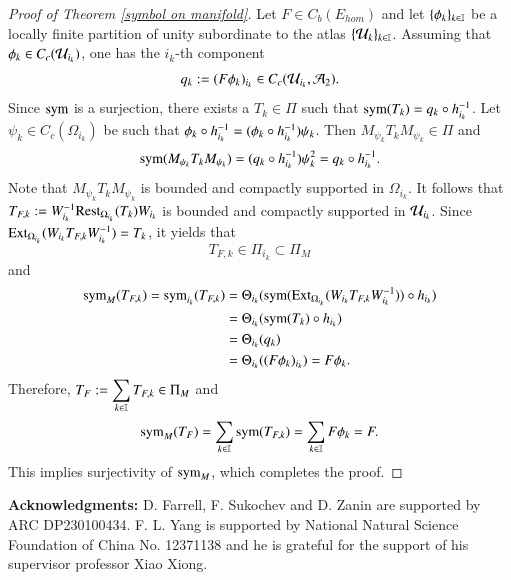 \documentclass[leqno]{amsart}
\begin{document}
\begin{proof}[Proof of Theorem \ref{symbol on manifold}]
		Let $F\in C_{b}(E_{hom})$ and let $\{\phi_{k}\}_{k\in\mathbb I}$ be a locally finite partition of unity subordinate to the atlas $\{{\mathcal U}_{k}\}_{k\in\mathbb I}$. Assuming that $\phi_{k}\in C_{c}({\mathcal U}_{i_{k}})$, one has the $i_{k}$-th component $$q_{k}:=(F\phi_{k})_{i_{k}}\in C_{c}({\mathcal U}_{i_{k}},{\mathcal A}_{2}).$$
		Since ${\rm sym}$ is a surjection, there exists a $T_{k}\in\Pi$ such that ${\rm sym}(T_{k})=q_{k}\circ h_{i_{k}}^{-1}$. Let $\psi_{k}\in C_{c}(\Omega_{i_{k}})$ be such that $\phi_{k}\circ h_{i_{k}}^{-1}=(\phi_{k}\circ h_{i_{k}}^{-1})\psi_{k}$. Then $M_{\psi_{k}}T_{k}M_{\psi_{k}}\in\Pi$ and $${\rm sym}(M_{\psi_{k}}T_{k}M_{\psi_{k}})=(q_{k}\circ h_{i_{k}}^{-1})\psi_{k}^{2}=q_{k}\circ h_{i_{k}}^{-1}.$$
		Note that $M_{\psi_{k}}T_{k}M_{\psi_{k}}$ is bounded and compactly supported in $\Omega_{i_{k}}$. It follows that $T_{F,k}:=W_{i_{k}}^{-1} {\rm Rest}_{\Omega_{i_{k}}}(T_{k}) W_{i_{k}}$ is bounded and compactly supported in ${\mathcal U}_{i_{k}}$. Since ${\rm Ext}_{\Omega_{i_{k}}}(W_{i_{k}}T_{F,k}W_{i_{k}}^{-1})=T_{k}$, it yields that $$T_{F,k}\in\Pi_{i_{k}}\subset\Pi_{M}$$ and
		\begin{align*}
			{\rm sym}_{M}(T_{F,k})={\rm sym}_{i_{k}}(T_{F,k})
			&=\Theta_{i_{k}}({\rm sym}({\rm Ext}_{\Omega_{i_{k}}}(W_{i_{k}}T_{F,k}W_{i_{k}}^{-1}))\circ h_{i_{k}})\\
			&=\Theta_{i_{k}}({\rm sym}(T_{k})\circ h_{i_{k}})\\
			&=\Theta_{i_{k}}(q_{k})\\
			&=\Theta_{i_{k}}((F\phi_{k})_{i_{k}})=F\phi_{k}.
		\end{align*} 
		Therefore, $\displaystyle T_{F}:=\sum_{k\in\mathbb I}T_{F,k}\in\Pi_{M}$ and $${\rm sym}_{M}(T_{F})=\sum_{k\in\mathbb I}{\rm sym}(T_{F,k})=\sum_{k\in\mathbb I}F\phi_{k}=F.$$
		This implies surjectivity of ${\rm sym}_{M}$, which completes the proof.
	\end{proof}
	
	
	\bigskip
	
	{\bf Acknowledgments:} D. Farrell, F. Sukochev  and D. Zanin are supported by ARC DP230100434. 
 F. L. Yang is supported by National Natural Science Foundation of China No. 12371138 and he is grateful for the support of his supervisor professor Xiao Xiong.	
	
\end{document}
